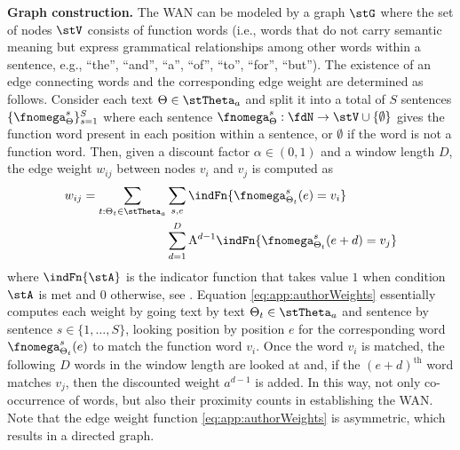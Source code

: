 \textbf{Graph construction.} The WAN can be modeled by a graph $\stG$ where the set of nodes $\stV$ consists of function words (i.e., words that do not carry semantic meaning but express grammatical relationships among other words within a sentence, e.g., ``the'', ``and'', ``a'', ``of'', ``to'', ``for'', ``but''). The existence of an edge connecting words and the corresponding edge weight are determined as follows. Consider each text $\theta \in \stTheta_{a}$ and split it into a total of $S$ sentences $\{\fnomega_{\theta}^{s}\}_{s = 1}^S$ where each sentence $\fnomega_{\theta}^{s}: \fdN \to \stV \cup \{\emptyset\}$ gives the function word present in each position within a sentence, or $\emptyset$ if the word is not a function word. Then, given a discount factor $\alpha \in (0,1)$ and a window length $D$, the edge weight $w_{ij}$ between nodes $v_{i}$ and $v_{j}$ is computed as %
\begin{equation} \label{eq:app:authorWeights}
%
\begin{aligned}
    w_{ij} = \sum_{t : \theta_{t} \in \stTheta_{a}} & \sum_{s,e} \indFn \{\fnomega_{\theta_{t}}^{s} (e) = v_{i}\} \\ & \sum_{d=1}^{D} \alpha^{d-1} \indFn\{\fnomega_{\theta_{t}}^{s}(e+d) = v_{j}\}
\end{aligned}
%
\end{equation}
%
where $\indFn\{\stA\}$ is the indicator function that takes value $1$ when condition $\stA$ is met and 0 otherwise, see \cite{Segarra2015-Authorship}. Equation \eqref{eq:app:authorWeights} essentially computes each weight by going text by text $\theta_{t} \in \stTheta_{a}$ and sentence by sentence $s \in \{1,\ldots,S\}$, looking position by position $e$ for the corresponding word $\fnomega_{\theta_{t}}^{s}(e)$ to match the function word $v_{i}$. Once the word $v_{i}$ is matched, the following $D$ words in the window length are looked at and, if the $(e+d)^{\text{th}}$ word matches $v_{j}$, then the discounted weight $a^{d-1}$ is added. In this way, not only co-occurrence of words, but also their proximity counts in establishing the WAN. Note that the edge weight function \eqref{eq:app:authorWeights} is asymmetric, which results in a directed graph.

